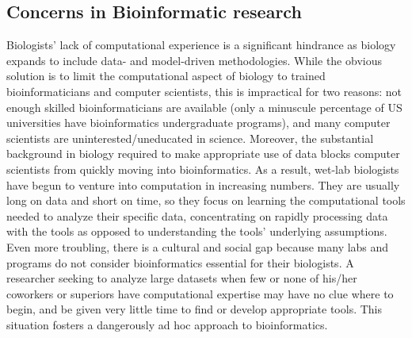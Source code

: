 \documentclass[ChapterTOCs,krantz2]{krantz} %
\begin{document}
\subsection{Concerns in Bioinformatic research}

Biologists' lack of computational experience is a significant hindrance as
biology expands to include data- and model-driven methodologies.
While the obvious solution is to limit the computational aspect of
biology to trained bioinformaticians and computer scientists,
this is impractical for two reasons:
not enough skilled bioinformaticians are available (only a minuscule percentage
of US universities have bioinformatics undergraduate programs), and many
computer scientists are uninterested/uneducated in science.  Moreover, the
substantial background in biology required to make appropriate use of
data blocks computer scientists from quickly moving into bioinformatics.
As a result,
wet-lab biologists have begun to venture into computation in increasing
numbers\cite{Heaton2012,Kelly2008}.
They are usually long on data and short on time, so they
focus on learning the computational tools needed to analyze their specific
data, concentrating on rapidly processing data with the tools 
as opposed to understanding the tools' underlying
assumptions.  Even more troubling, there is a cultural and social gap
because many labs and programs do not consider bioinformatics
essential for their biologists\cite{Segal2007}.  A researcher seeking to analyze large datasets 
when few or none of his/her coworkers or superiors have
computational expertise may have no clue where to begin, and be given very little
time to find or develop appropriate tools.  This situation fosters a dangerously ad hoc
approach to bioinformatics.    
\end{document}
